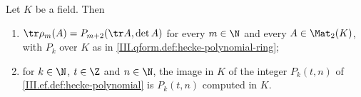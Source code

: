 Let $K$ be a field. Then
\begin{enumerate}[label=(\alph*)]
\item $\tr\rho_m(A)=P_{m+2}(\tr A,\det A)$ for every $m\in\N$ and every $A\in\Mat_2(K)$, with $P_k$ over $K$ as in
  \cref{III.qform.def:hecke-polynomial-ring};
\item for $k\in\N$, $t\in\Z$ and $n\in\N$, the image in $K$ of the integer $P_k(t,n)$ of \cref{III.ef.def:hecke-polynomial} is $P_k(t,n)$ computed in $K$.
\end{enumerate}
